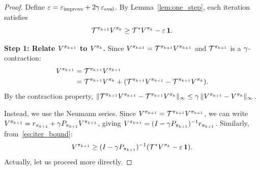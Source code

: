 \documentclass[11pt,a4paper]{article}
\begin{document}
\begin{proof}
Define $\varepsilon = \varepsilon_{\mathrm{improve}}
+ 2\gamma\,\varepsilon_{\mathrm{eval}}$. By
Lemma~\ref{lem:one_step}, each iteration satisfies
\begin{equation}
  \mathcal{T}^{\pi_{k+1}} V^{\pi_k}
  \geq \mathcal{T}^* V^{\pi_k} - \varepsilon\,\mathbf{1}.
  \label{eq:iter_bound}
\end{equation}

\textbf{Step 1: Relate $V^{\pi_{k+1}}$ to $V^{\pi_k}$.}
Since $V^{\pi_{k+1}} = \mathcal{T}^{\pi_{k+1}} V^{\pi_{k+1}}$
and $\mathcal{T}^{\pi_{k+1}}$ is a $\gamma$-contraction:
\begin{align}
  V^{\pi_{k+1}}
  &= \mathcal{T}^{\pi_{k+1}} V^{\pi_{k+1}} \nonumber\\
  &= \mathcal{T}^{\pi_{k+1}} V^{\pi_k}
     + (\mathcal{T}^{\pi_{k+1}} V^{\pi_{k+1}}
     - \mathcal{T}^{\pi_{k+1}} V^{\pi_k}).
  \label{eq:v_expand}
\end{align}
By the contraction property,
$\|\mathcal{T}^{\pi_{k+1}} V^{\pi_{k+1}}
- \mathcal{T}^{\pi_{k+1}} V^{\pi_k}\|_\infty
\leq \gamma\,\|V^{\pi_{k+1}} - V^{\pi_k}\|_\infty$.

Instead, we use the Neumann series. Since
$V^{\pi_{k+1}} = \mathcal{T}^{\pi_{k+1}} V^{\pi_{k+1}}$, we
can write $V^{\pi_{k+1}} = r_{\pi_{k+1}}
+ \gamma P_{\pi_{k+1}} V^{\pi_{k+1}}$, giving
$V^{\pi_{k+1}} = (I - \gamma P_{\pi_{k+1}})^{-1}
r_{\pi_{k+1}}$. Similarly, from~\eqref{eq:iter_bound}:
\begin{equation}
  V^{\pi_{k+1}}
  \geq (I - \gamma P_{\pi_{k+1}})^{-1}
  (\mathcal{T}^* V^{\pi_k} - \varepsilon\,\mathbf{1}).
  \label{eq:neumann_bound}
\end{equation}
Actually, let us proceed more directly.


\end{proof}
\end{document}
